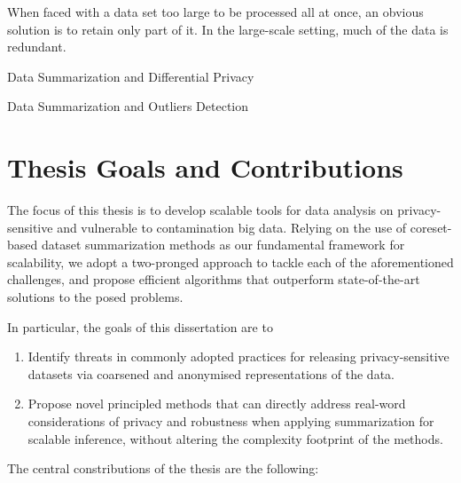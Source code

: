 When faced with a data set too large to be processed all at once, an obvious solution is to retain only part of it.  In the large-scale setting, much of the data is redundant.

\par{Data Summarization and Differential Privacy}

\par{Data Summarization and Outliers Detection}

\section{Thesis Goals and Contributions}
\label{sec:thesis-goals}

The focus of this thesis is to develop scalable tools for data analysis on privacy-sensitive and vulnerable to contamination big data. Relying on the use of coreset-based dataset summarization methods as our fundamental framework for scalability, we adopt a two-pronged approach to tackle each of the aforementioned challenges, and propose efficient algorithms that outperform state-of-the-art solutions to the posed problems. 

In particular, the goals of this dissertation are to

\begin{enumerate}
	\item Identify threats in commonly adopted practices for releasing privacy-sensitive datasets via coarsened and anonymised representations of the data.
	\item Propose novel principled methods that can directly address real-word considerations of privacy and robustness when applying summarization for scalable inference, without altering the complexity footprint of the methods.
\end{enumerate}

The central constributions of the thesis are the following:

